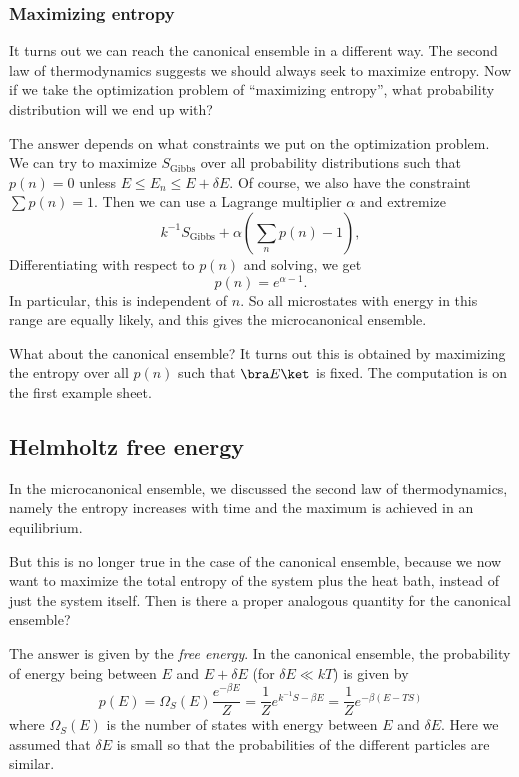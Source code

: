 \documentclass[a4paper]{article}
\begin{document}
\subsubsection*{Maximizing entropy}
It turns out we can reach the canonical ensemble in a different way. The second law of thermodynamics suggests we should always seek to maximize entropy. Now if we take the optimization problem of ``maximizing entropy'', what probability distribution will we end up with?

The answer depends on what constraints we put on the optimization problem. We can try to maximize $S_{\mathrm{Gibbs}}$ over all probability distributions such that $p(n) = 0$ unless $E \leq E_n \leq E + \delta E$. Of course, we also have the constraint $\sum p(n) = 1$. Then we can use a Lagrange multiplier $\alpha$ and extremize
\[
  k^{-1}S_{\mathrm{Gibbs}} + \alpha \left(\sum_n p(n) - 1\right),
\]
Differentiating with respect to $p(n)$ and solving, we get
\[
  p(n) = e^{\alpha - 1}.
\]
In particular, this is independent of $n$. So all microstates with energy in this range are equally likely, and this gives the microcanonical ensemble.

What about the canonical ensemble? It turns out this is obtained by maximizing the entropy over all $p(n)$ such that $\bra E\ket$ is fixed. The computation is on the first example sheet.

\subsection{Helmholtz free energy}

In the microcanonical ensemble, we discussed the second law of thermodynamics, namely the entropy increases with time and the maximum is achieved in an equilibrium.

But this is no longer true in the case of the canonical ensemble, because we now want to maximize the total entropy of the system plus the heat bath, instead of just the system itself. Then is there a proper analogous quantity for the canonical ensemble?

The answer is given by the \emph{free energy}. In the canonical ensemble, the probability of energy being between $E$ and $E + \delta E$ (for $\delta E \ll kT$) is given by
\[
  p(E) = \Omega_S(E) \frac{e^{-\beta E}}{Z} = \frac{1}{Z} e^{k^{-1} S - \beta E} = \frac{1}{Z} e^{-\beta (E - TS)}
\]
where $\Omega_S(E)$ is the number of states with energy between $E$ and $\delta E$. Here we assumed that $\delta E$ is small so that the probabilities of the different particles are similar. %
\end{document}
